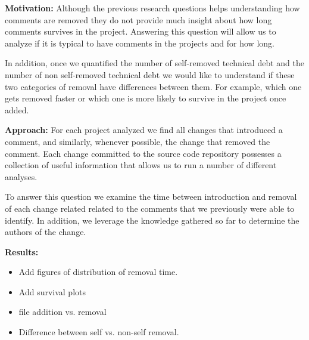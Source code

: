 
\vspace{3mm}
\noindent\rqiii
\vspace{3mm}

\noindent \textbf{Motivation:} Although the previous research questions helps understanding how \SATD comments are removed they do not provide much insight about how long \SATD comments survives in the project. Answering this question will allow us to analyze if it is typical to have \SATD comments in the projects and for how long.  

In addition, once we quantified the number of self-removed technical debt and the number of non self-removed technical debt we would like to understand if these two categories of removal have differences between them. For example, which one gets removed faster or which one is more likely to survive in the project once added. 

\vspace{1mm}
\noindent \textbf{Approach:} For each project analyzed we find all changes that introduced a \SATD comment, and similarly, whenever possible, the change that removed the \SATD comment. Each change committed to the source code repository possesses a collection of useful information  that allows us to run a number of different analyses. 

To answer this question we examine the time between introduction and removal of each change related related to the \SATD comments that we previously were able to identify. In addition, we leverage the knowledge gathered so far to determine the authors of the change. 

\vspace{1mm}
\noindent \textbf{Results:} 
\begin{itemize}
\item Add figures of distribution of removal time.
\item Add survival plots
\item file addition vs. removal
\item Difference between self vs. non-self removal.
\end{itemize}


